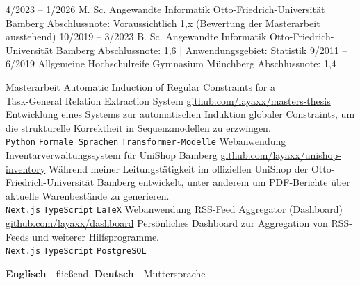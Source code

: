 \documentclass[9pt]{developercv} %
\begin{document}
\vspace{-10 pt}
\begin{entrylist}
	\entry
	{4/2023 -- 1/2026}
	{M. Sc. Angewandte Informatik}
	{Otto-Friedrich-Universität Bamberg}
	{Abschlussnote: Voraussichtlich 1,x (Bewertung der Masterarbeit ausstehend)}
	\entry
	{10/2019 -- 3/2023}
	{B. Sc. Angewandte Informatik}
	{Otto-Friedrich-Universität Bamberg}
	{Abschlussnote: 1,6 | Anwendungsgebiet: Statistik}
	\entry
	{9/2011 -- 6/2019}
	{Allgemeine Hochschulreife}
	{Gymnasium Münchberg}
	{Abschlussnote: 1,4}
\end{entrylist}

\vspace{-10 pt}
\begin{entrylist}
	\entry
	{Masterarbeit}
	{Automatic Induction of Regular Constraints for a\\ Task-General Relation Extraction System}
	{\href{https://github.com/layaxx/masters-thesis}{github.com/layaxx/masters-thesis}}
	{Entwicklung eines Systems zur automatischen Induktion globaler Constraints, um die strukturelle Korrektheit in Sequenzmodellen zu erzwingen.\\
		\texttt{Python} \slashsep \texttt{Formale Sprachen} \slashsep \texttt{Transformer-Modelle}}
	\entry
	{Webanwendung}
	{Inventarverwaltungssystem für UniShop Bamberg}
	{\href{https://github.com/layaxx/unishop-inventory}{github.com/layaxx/unishop-inventory}}
	{Während meiner Leitungstätigkeit im offiziellen UniShop der Otto-Friedrich-Universität Bamberg entwickelt, unter anderem um PDF-Berichte über aktuelle Warenbestände zu generieren.\\
		\texttt{Next.js} \slashsep \texttt{TypeScript} \slashsep \texttt{LaTeX}}
	\entry
	{Webanwendung}
	{RSS-Feed Aggregator (Dashboard)}
	{\href{https://github.com/layaxx/dashboard}{github.com/layaxx/dashboard}}
	{Persönliches Dashboard zur Aggregation von RSS-Feeds und weiterer Hilfsprogramme.\\
		\texttt{Next.js} \slashsep \texttt{TypeScript} \slashsep \texttt{PostgreSQL}}
\end{entrylist}
\vspace{-10 pt}
\vspace{-6pt}

\hspace{26mm} \textbf{Englisch} - fließend, \textbf{ Deutsch} - Muttersprache

\end{document}
